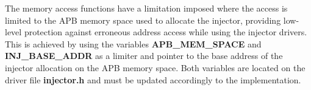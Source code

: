 The memory access functions have a limitation imposed where the access is limited to the APB memory space used to allocate the injector, providing low-level 
protection against erroneous address access while using the injector drivers. 
This is achieved by using the variables \textbf{APB\_MEM\_SPACE} and \textbf{INJ\_BASE\_ADDR} as a limiter and pointer to the base address of the injector 
allocation on the APB memory space.
Both variables are located on the driver file \textbf{injector.h} and must be updated accordingly to the implementation.

